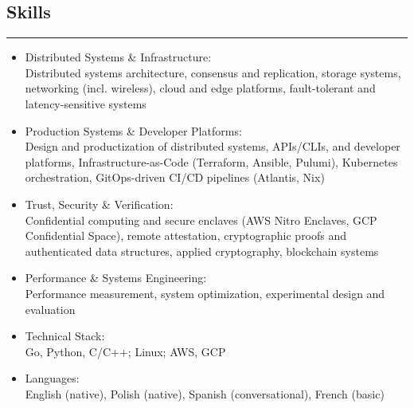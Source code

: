 \vspace{0.1cm}

\subsection*{Skills}
\hrule
\vspace{0.2cm}

\begin{itemize}
    \item Distributed Systems \& Infrastructure: \\
    Distributed systems architecture,
    consensus and replication,
    storage systems,
    networking (incl. wireless),
    cloud and edge platforms,
    fault-tolerant and latency-sensitive systems

    \item Production Systems \& Developer Platforms: \\
    Design and productization of distributed systems,
    APIs/CLIs, and developer platforms,
    Infrastructure-as-Code (Terraform, Ansible, Pulumi),
    Kubernetes orchestration,
    GitOps-driven CI/CD pipelines (Atlantis, Nix)

    \item Trust, Security \& Verification: \\
    Confidential computing and secure enclaves (AWS Nitro Enclaves, GCP
    Confidential Space),
    remote attestation,
    cryptographic proofs and authenticated data structures,
    applied cryptography,
    blockchain systems

    \item Performance \& Systems Engineering: \\
    Performance measurement, system optimization, experimental design and
    evaluation

    \item Technical Stack: \\
    Go, Python, C/C++; Linux; AWS, GCP

    \item Languages: \\
    English (native), Polish (native), Spanish (conversational), French (basic)
\end{itemize}